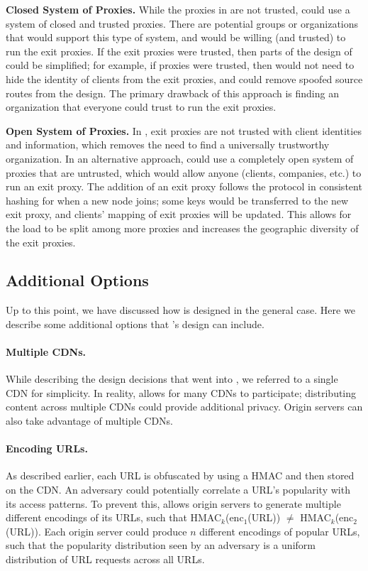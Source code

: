 {\bf Closed System of Proxies.} While the proxies in \system{} are not trusted, \system{} could 
use a system of closed and trusted proxies.  There are potential groups or organizations that would 
support this type of system, and would be willing (and trusted) to run the exit proxies.  If the exit
proxies were trusted, then parts of the design of \system{} could be simplified; for example, if proxies 
were trusted, then \system{} would not need to hide the identity of clients from the exit proxies, and could 
remove spoofed source routes from the design.  The primary drawback of this approach is finding an organization 
that everyone could trust to run the exit proxies.  

{\bf Open System of Proxies.} In \system{}, exit proxies are not 
trusted with client identities and information, which removes the need to find a universally trustworthy 
organization.  In an alternative approach, \system{} could use a completely open system of proxies that are 
untrusted, which would allow anyone (clients, companies, etc.) to run an exit proxy.  
The addition of an exit proxy follows the protocol in consistent hashing for when a new node 
joins; some keys would be transferred to the new exit proxy, and clients' mapping of 
exit proxies will be updated.  This allows for the load to be split among more proxies and 
increases the geographic diversity of the exit proxies.  

\subsection{Additional Options}
Up to this point, we have discussed how \system{} is designed in the general case.  Here we describe some 
additional options that \system{}'s design can include.

\paragraph{Multiple CDNs.}
While describing the design decisions that went into \system{}, we referred to a single CDN for 
simplicity.  In reality, \system{} allows for many CDNs to participate;
distributing content across
multiple CDNs could provide additional privacy. Origin servers can also take advantage
of multiple CDNs.

\paragraph{Encoding URLs.}
As described earlier, each URL is obfuscated by using a HMAC and then stored on the CDN.  An adversary 
could potentially correlate a URL's popularity with its access patterns.  To prevent this, \system{} allows 
origin servers to generate multiple different encodings of its URLs, such that HMAC$_k$(enc$_1$(URL)) $\neq$ 
HMAC$_k$(enc$_2$(URL)).  Each origin server could produce $n$ different encodings of popular URLs, such that 
the popularity distribution seen by an adversary is a uniform distribution of URL requests across all URLs.  

